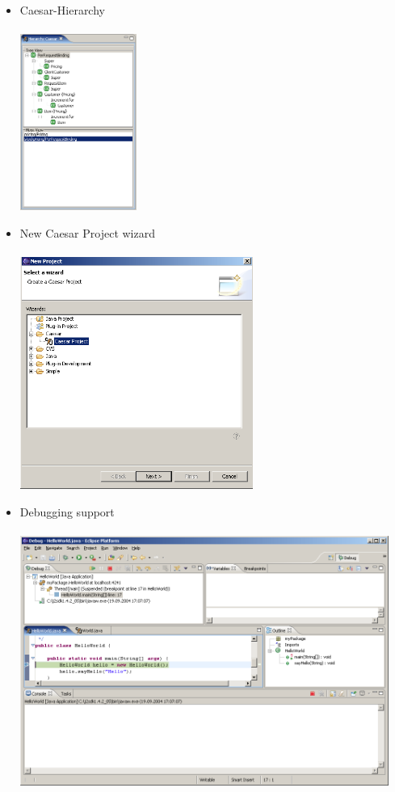\begin{itemize}
  \item Caesar-Hierarchy\\\\
	\includegraphics[width=0.30\textwidth]{images/hierarchy.png}\newpage

     
  \item New Caesar Project wizard\\\\
  \includegraphics[width=0.60\textwidth]{images/project_wizard.png}\\

  \item Debugging support\\\\
	\includegraphics[width=0.95\textwidth]{images/debug1.png}\\
\end{itemize}
